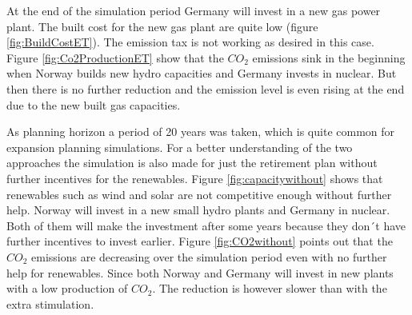 \documentclass{article}
\begin{document}
\begin{itemize}
At the end of the simulation period Germany will invest in a new gas power plant. The built cost for the new gas plant are quite low (figure \ref{fig:BuildCostET}). The emission tax is not working as desired in this case. Figure \ref{fig:Co2ProductionET} show that the $CO_2$ emissions sink in the beginning when Norway builds new hydro capacities and Germany invests in nuclear. But then there is no further reduction and the emission level is even rising at the end due to the new built gas capacities.
\end{itemize}
As planning horizon a period of 20 years was taken, which is quite common for expansion planning simulations. For a better understanding of the two approaches the simulation is also made for just the retirement plan without further incentives for the renewables. Figure \ref{fig:capacitywithout} shows that renewables such as wind and solar are not competitive enough without further help.  Norway will invest in a new small hydro plants and Germany in nuclear. Both of them will make the investment after some years because they don´t have further incentives to invest earlier. Figure \ref{fig:CO2without} points out that the $CO_2$ emissions are decreasing over the simulation period even with no further help for renewables. Since both Norway and Germany will invest in new plants with a low production of $CO_2$. The reduction is however slower than with the extra stimulation.
\end{document}
